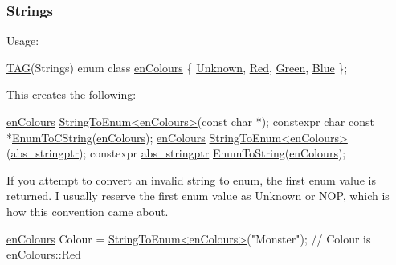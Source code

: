 \subsubsection*{Strings}

Usage\+: 
\begin{DoxyCode}
\hyperlink{Generated__001_8h_ad9b15e5b6d9b1ed55b76d9916ff6dec2}{TAG}(Strings)
\textcolor{keyword}{enum class} \hyperlink{PreprocTest_8h_a081cf1a0e70d6e2bd48c98f457742877}{enColours}
\{
    \hyperlink{ab__file_8h_a1b665fc63cb310d53283fbcd1b19746ea88183b946cc5f0e8c96b2e66e1c74a7e}{Unknown},
    \hyperlink{PreprocTest_8h_a081cf1a0e70d6e2bd48c98f457742877aee38e4d5dd68c4e440825018d549cb47}{Red},
    \hyperlink{PreprocTest_8h_a081cf1a0e70d6e2bd48c98f457742877ad382816a3cbeed082c9e216e7392eed1}{Green},
    \hyperlink{PreprocTest_8h_a081cf1a0e70d6e2bd48c98f457742877a9594eec95be70e7b1710f730fdda33d9}{Blue}
\};
\end{DoxyCode}


This creates the following\+: 
\begin{DoxyCode}
\hyperlink{PreprocTest_8h_a081cf1a0e70d6e2bd48c98f457742877}{enColours} \hyperlink{Generated__Test_8h_ad369bcb4826dc155da6b130a0fa97d13}{StringToEnum<enColours>}(\textcolor{keyword}{const} \textcolor{keywordtype}{char} *);
constexpr \textcolor{keywordtype}{char} \textcolor{keyword}{const} *\hyperlink{Generated__001_8h_ac9652e168fff50424ca0f861bd91ef4f}{EnumToCString}(\hyperlink{PreprocTest_8h_a081cf1a0e70d6e2bd48c98f457742877}{enColours});
\hyperlink{PreprocTest_8h_a081cf1a0e70d6e2bd48c98f457742877}{enColours} \hyperlink{Generated__Test_8h_ad369bcb4826dc155da6b130a0fa97d13}{StringToEnum<enColours>}(\hyperlink{structabs__stringptr}{abs\_stringptr});
constexpr \hyperlink{structabs__stringptr}{abs\_stringptr} \hyperlink{Generated__001_8h_a6be15e450a8768a136197010c8e7b73f}{EnumToString}(\hyperlink{PreprocTest_8h_a081cf1a0e70d6e2bd48c98f457742877}{enColours});
\end{DoxyCode}


If you attempt to convert an invalid string to enum, the first enum value is returned. I usually reserve the first enum value as \textquotesingle{}Unknown\textquotesingle{} or \textquotesingle{}N\+OP\textquotesingle{}, which is how this convention came about.


\begin{DoxyCode}
\hyperlink{PreprocTest_8h_a081cf1a0e70d6e2bd48c98f457742877}{enColours} Colour = \hyperlink{Generated__Test_8h_ad369bcb4826dc155da6b130a0fa97d13}{StringToEnum<enColours>}(\textcolor{stringliteral}{"Monster"});
\textcolor{comment}{// Colour is enColours::Red}
\end{DoxyCode}


